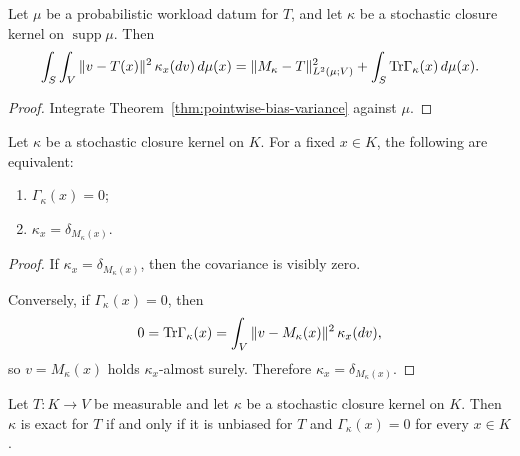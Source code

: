 \begin{corollary}
\label{cor:integrated-bias-variance}
Let \(\mu\) be a probabilistic workload datum for \(T\), and let \(\kappa\) be
a stochastic closure kernel on \(\operatorname{supp}\mu\). Then
\[
\int_S\int_V \|v-T(x)\|^2\,\kappa_x(dv)\,d\mu(x)
=
\|M_{\kappa}-T\|_{L^2(\mu;V)}^2
+
\int_S \mathrm{Tr}\Gamma_{\kappa}(x)\,d\mu(x).
\]
\end{corollary}

\begin{proof}
Integrate Theorem~\ref{thm:pointwise-bias-variance} against \(\mu\).
\end{proof}

\begin{proposition}
\label{prop:zero-covariance-criterion}
Let \(\kappa\) be a stochastic closure kernel on \(K\). For a fixed \(x\in K\),
the following are equivalent:
\begin{enumerate}[label=(\roman*), leftmargin=2em, itemsep=0.2em]
\item \(\Gamma_{\kappa}(x)=0\);
\item \(\kappa_x=\delta_{M_{\kappa}(x)}\).
\end{enumerate}
\end{proposition}

\begin{proof}
If \(\kappa_x=\delta_{M_{\kappa}(x)}\), then the covariance is visibly zero.

Conversely, if \(\Gamma_{\kappa}(x)=0\), then
\[
0=\mathrm{Tr}\Gamma_{\kappa}(x)
=
\int_V \|v-M_{\kappa}(x)\|^2\,\kappa_x(dv),
\]
so \(v=M_{\kappa}(x)\) holds \(\kappa_x\)-almost surely. Therefore
\(\kappa_x=\delta_{M_{\kappa}(x)}\).
\end{proof}

\begin{corollary}
\label{cor:deterministic-zero-noise-edge}
Let \(T:K\to V\) be measurable and let \(\kappa\) be a stochastic closure
kernel on \(K\). Then \(\kappa\) is exact for \(T\) if and only if it is
unbiased for \(T\) and \(\Gamma_{\kappa}(x)=0\) for every \(x\in K\).
\end{corollary}

